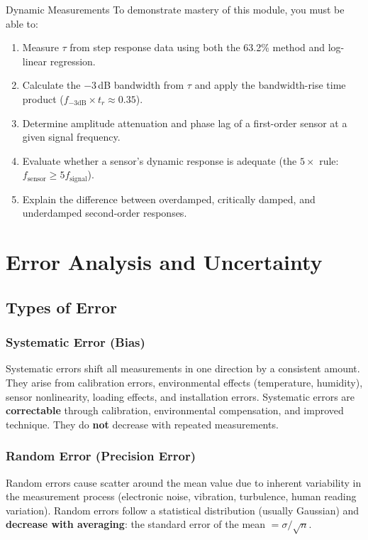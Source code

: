 \documentclass[11pt,letterpaper,twoside,openany]{book}
\begin{document}

\begin{masterycheckbox}{Dynamic Measurements}
To demonstrate mastery of this module, you must be able to:
\begin{enumerate}[nosep,leftmargin=1.5em]
\item Measure $\tau$ from step response data using both the 63.2\% method and log-linear regression.
\item Calculate the $-3$\,dB bandwidth from $\tau$ and apply the bandwidth-rise time product ($f_{-3\text{dB}} \times t_r \approx 0.35$).
\item Determine amplitude attenuation and phase lag of a first-order sensor at a given signal frequency.
\item Evaluate whether a sensor's dynamic response is adequate (the $5\times$ rule: $f_{\text{sensor}} \geq 5 f_{\text{signal}}$).
\item Explain the difference between overdamped, critically damped, and underdamped second-order responses.
\end{enumerate}
\end{masterycheckbox}

\chapter{Error Analysis and Uncertainty}
\label{ch:error}

\section{Types of Error}

\subsection{Systematic Error (Bias)}
Systematic errors shift all measurements in one direction by a consistent amount. They arise from calibration errors, environmental effects (temperature, humidity), sensor nonlinearity, loading effects, and installation errors. Systematic errors are \textbf{correctable} through calibration, environmental compensation, and improved technique. They do \textbf{not} decrease with repeated measurements.

\subsection{Random Error (Precision Error)}
Random errors cause scatter around the mean value due to inherent variability in the measurement process (electronic noise, vibration, turbulence, human reading variation). Random errors follow a statistical distribution (usually Gaussian) and \textbf{decrease with averaging}: the standard error of the mean $= \sigma / \sqrt{n}$.
\end{document}
